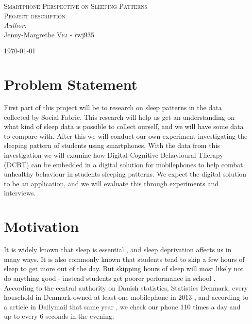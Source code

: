 \documentclass[12pt]{article}
\begin{document}

\begin{center}
\textsc{\Large Smartphone Perspective on Sleeping Patterns}\\[0.5cm] 
\textsc{\large Project description}\\[0.5cm] 


\emph{Author:}
\\
Jenny-Margrethe \textsc{Vej} - rwj935\\ 
\vspace{10mm}

{\large \today}\\[3cm] 
\end{center}
\vspace{-20mm}

\section{Problem Statement}
First part of this project will be to research on sleep patterns in the data collected by Social 
Fabric\cite{Stopczynski2014}. This research will help us get an understanding on what kind of 
sleep data is possible to collect ourself, and we will have some data to compare with. After this 
we will conduct our own experiment investigating the sleeping pattern of students using smartphones. 
With the data from this investigation we will examine how Digital Cognitive Behavioural Therapy 
(DCBT) can be embedded in a digital solution for mobilephones to help combat unhealthy behaviour in 
students sleeping patterns. We expect the digital solution to be an application, and we will evaluate
this through experiments and interviews. 

\section{Motivation}
It is widely known that sleep is essential \cite{Gumbiner2012}, and sleep deprivation affects 
us in many ways. It is also commonly known that students tend to skip a few hours of sleep to 
get more out of the day. But skipping hours of sleep will most likely not do anything good - instead
students get poorer performance in school \cite{Gilbert2010}. \\

According to the central authority on Danish statistics, Statistics Denmark, every household in 
Denmark owned at least one mobilephone in 2013 \cite{DanmarksStatistik2013}, and according 
to a article in Dailymail that same year \cite{Woollaston2013}, we check our phone 110 times a 
day and up to every 6 seconds in the evening. \\
\end{document}
